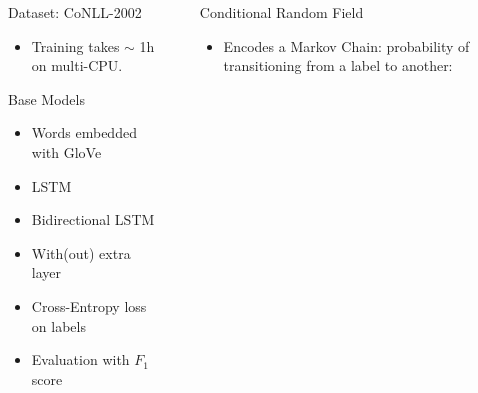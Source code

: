 \documentclass[final]{beamer}
\newlength{\sepwid}
\newlength{\onecolwid}
\newlength{\twocolwid}
\begin{document}
\begin{frame}[t]
\begin{columns}[t]
\begin{column}{\onecolwid}
\begin{block}{Dataset: CoNLL-2002}
\begin{itemize}
  \item Training takes $\sim$ 1h on multi-CPU.
\end{itemize}
\end{block}

\begin{block}{Base Models}

\begin{itemize}
  \item Words embedded with GloVe

  \item LSTM

  \item Bidirectional LSTM

  \item With(out) extra layer

  \item Cross-Entropy loss on labels

  \item Evaluation with $F_1$ score
\end{itemize}

\end{block}

\end{column} %




\begin{column}{\sepwid}\end{column} %

\begin{column}{\twocolwid} %

\begin{columns}[t,totalwidth=\twocolwid] %

\begin{column}{\onecolwid}\vspace{-.6in} %


\begin{block}{Conditional Random Field}

  \begin{itemize}
  \item Encodes a Markov Chain: probability of transitioning from a label to another:


\end{itemize}
\end{block}
\end{column}
\end{columns}
\end{column}
\end{columns}
\end{frame}
\end{document}
